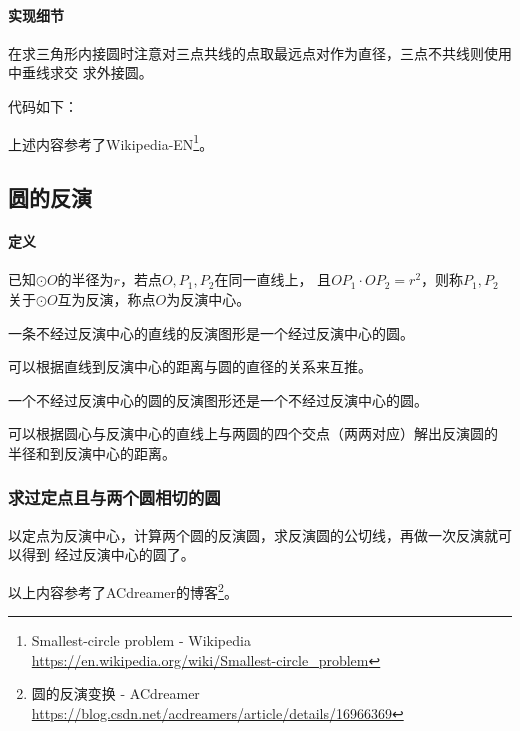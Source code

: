 \paragraph{实现细节}
在求三角形内接圆时注意对三点共线的点取最远点对作为直径，三点不共线则使用中垂线求交
求外接圆。

代码如下：


上述内容参考了Wikipedia-EN\footnote{
	Smallest-circle problem - Wikipedia\\
	\url{https://en.wikipedia.org/wiki/Smallest-circle\_problem}
}。
\subsection{圆的反演}
\paragraph{定义} 已知$\odot O$的半径为$r$，若点$O,P_1,P_2$在同一直线上，
且$OP_1\cdot OP_2=r^2$，则称$P_1,P_2$关于$\odot O$互为反演，称点$O$为反演中心。

\begin{property}
	一条不经过反演中心的直线的反演图形是一个经过反演中心的圆。
\end{property}
可以根据直线到反演中心的距离与圆的直径的关系来互推。

\begin{property}
	一个不经过反演中心的圆的反演图形还是一个不经过反演中心的圆。
\end{property}
可以根据圆心与反演中心的直线上与两圆的四个交点（两两对应）解出反演圆的
半径和到反演中心的距离。

\subsubsection{求过定点且与两个圆相切的圆}
以定点为反演中心，计算两个圆的反演圆，求反演圆的公切线，再做一次反演就可以得到
经过反演中心的圆了。

以上内容参考了ACdreamer的博客\footnote{
	圆的反演变换 - ACdreamer
	\url{https://blog.csdn.net/acdreamers/article/details/16966369}
}。
